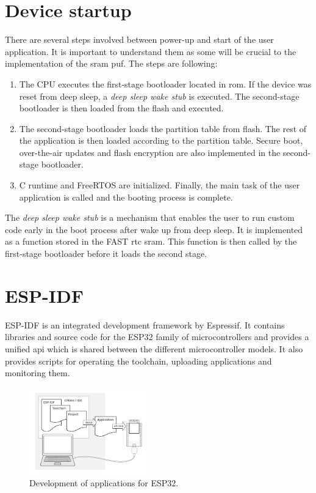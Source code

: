 \section{Device startup}

There are several steps involved between power-up and start of the user application. It is important to understand them as some will be crucial to the implementation of the \gls{sram} \gls{puf}. The steps are following:

\begin{enumerate}
    \item The CPU executes the first-stage bootloader located in \gls{rom}. If the device was reset from deep sleep, a \emph{deep sleep wake stub} is executed. The second-stage bootloader is then loaded from the flash and executed.
    \item The second-stage bootloader loads the partition table from flash. The rest of the application is then loaded according to the partition table. Secure boot, over-the-air updates and flash encryption are also implemented in the second-stage bootloader.
    \item C runtime and FreeRTOS are initialized. Finally, the main task of the user application is called and the booting process is complete.
\end{enumerate}

The \emph{deep sleep wake stub} is a mechanism that enables the user to run custom code early in the boot process after wake up from deep sleep. It is implemented as a function stored in the FAST \gls{rtc} \gls{sram}. This function is then called by the first-stage bootloader before it loads the second stage.\cite{espidf2022}

\section{ESP-IDF}

ESP-IDF is an integrated development framework by Espressif. It contains libraries and source code for the ESP32 family of microcontrollers and provides a unified \gls{api} which is shared between the different microcontroller models. It also provides scripts for operating the toolchain, uploading applications and monitoring them.\cite{espidf2022}

\begin{figure}[h!]
    \centering
    \captionsetup{justification=centering,margin=0.5cm}
    \includegraphics[width=0.45\textwidth]{images/upload_process.png}
    \caption[Development of applications for ESP32]{Development of applications for ESP32.\cite{espidf2022}}
    \label{fig:upload_process}
\end{figure}

